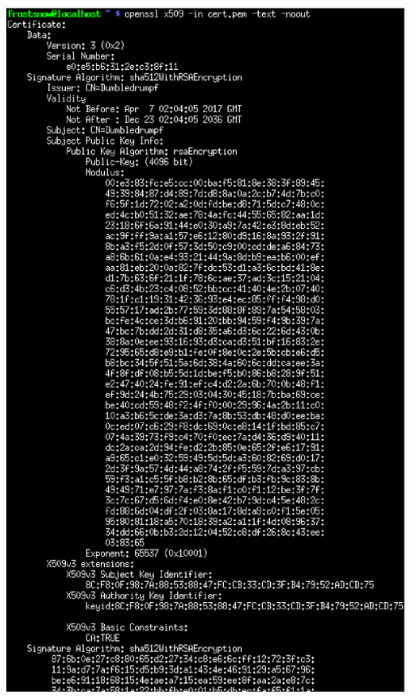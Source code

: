 \documentclass[xcolor={dvipsnames,svgnames},hyperref=dvips]{beamer}
\begin{document}
	\begin{frame}
		\center\includegraphics[scale=0.27]{viewselfcert.ps}
	\end{frame}
\end{document}
